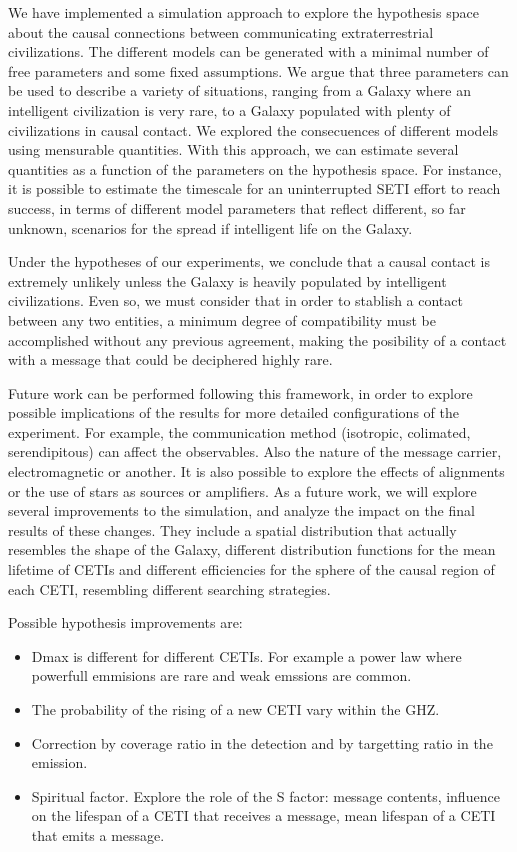 \documentclass[crop]{CSLB}%
\begin{document}
We have implemented a simulation approach to explore the hypothesis
space about the causal connections between communicating
extraterrestrial civilizations.
%
The different models can be generated with a minimal number of free
parameters and some fixed assumptions.
%
We argue that three parameters can be used to describe a variety of
situations, ranging from a Galaxy where an intelligent civilization is
very rare, to a Galaxy populated with plenty of civilizations in
causal contact.
%
We explored the consecuences of different models using mensurable
quantities.
%
With this approach, we can estimate several quantities as a function
of the parameters on the hypothesis space.
%
For instance, it is possible to estimate the timescale for an
uninterrupted SETI effort to reach success, in terms of different
model parameters that reflect different, so far unknown, scenarios
for the spread if intelligent life on the Galaxy.


Under the hypotheses of our experiments, we conclude that
a causal contact is extremely unlikely unless the Galaxy is heavily
populated by intelligent civilizations.
%
Even so, we must consider that in order to stablish a contact between
any two entities, a minimum degree of compatibility must be
accomplished without any previous agreement, 
making the posibility of a contact with a message that
could be deciphered highly rare.


Future work can be performed following this framework, in order to
explore possible implications of the results for more detailed 
configurations of the experiment.
%
For example, the communication method (isotropic, colimated,
serendipitous) can affect the observables.
%
Also the nature of the message carrier, electromagnetic or another.
%
It is also possible to explore the effects of alignments or the use of
stars as sources or amplifiers.
%
%
As a future work, we will explore several improvements to the
simulation, and analyze the impact on the final results of these
changes.
%
They include a spatial distribution that actually resembles the shape
of the Galaxy, different distribution functions for the mean lifetime
of CETIs and different efficiencies for the sphere of the causal
region of each CETI, resembling different searching strategies.


Possible hypothesis improvements are:

\begin{itemize}
   \item Dmax is different for different CETIs.  For example a power
      law where powerfull emmisions are rare and weak emssions are
      common.
   \item The probability of the rising of a new CETI vary within the
      GHZ.
   \item Correction by coverage ratio in the detection and by
      targetting ratio in the emission.
   \item Spiritual factor.  Explore the role of the S factor: message
      contents, influence on the lifespan of a CETI that receives a
      message, mean lifespan of a CETI that emits a message.
\end{itemize} 
\end{document}
